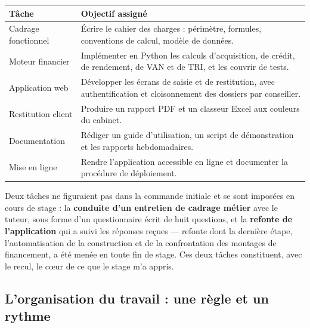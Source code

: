 \documentclass[12pt,a4paper]{article}
\begin{document}
\begin{table}[H]
	\centering
	\small
	\renewcommand{\arraystretch}{1.40}
	\begin{tabular}{|>{\raggedright\arraybackslash}p{4.3cm}|>{\raggedright\arraybackslash}p{10.6cm}|}
		\hline
		\rowcolor{eccblue!15}
		\textbf{\color{eccblue}Tâche} & \textbf{\color{eccblue}Objectif assigné} \\
		\hline
		\rowcolor{white}
		Cadrage fonctionnel & Écrire le cahier des charges : périmètre, formules,
		conventions de calcul, modèle de données. \\
		\hline
		\rowcolor{gray!8}
		Moteur financier & Implémenter en Python les calculs d'acquisition, de
		crédit, de rendement, de VAN et de TRI, et les couvrir de tests. \\
		\hline
		\rowcolor{white}
		Application web & Développer les écrans de saisie et de restitution, avec
		authentification et cloisonnement des dossiers par conseiller. \\
		\hline
		\rowcolor{gray!8}
		Restitution client & Produire un rapport PDF et un classeur Excel aux
		couleurs du cabinet. \\
		\hline
		\rowcolor{white}
		Documentation & Rédiger un guide d'utilisation, un script de démonstration
		et les rapports hebdomadaires. \\
		\hline
		\rowcolor{gray!8}
		Mise en ligne & Rendre l'application accessible en ligne et documenter la
		procédure de déploiement. \\
		\hline
	\end{tabular}
\end{table}

Deux tâches ne figuraient pas dans la commande initiale et se sont imposées en
cours de stage : la \textbf{conduite d'un entretien de cadrage métier} avec le
tuteur, sous forme d'un questionnaire écrit de huit questions, et la
\textbf{refonte de l'application} qui a suivi les réponses reçues --- refonte
dont la dernière étape, l'automatisation de la construction et de la
confrontation des montages de financement, a été menée en toute fin de stage.
Ces deux tâches constituent, avec le recul, le cœur de ce que le stage m'a
appris.


\subsection{L'organisation du travail : une règle et un rythme}
\end{document}
